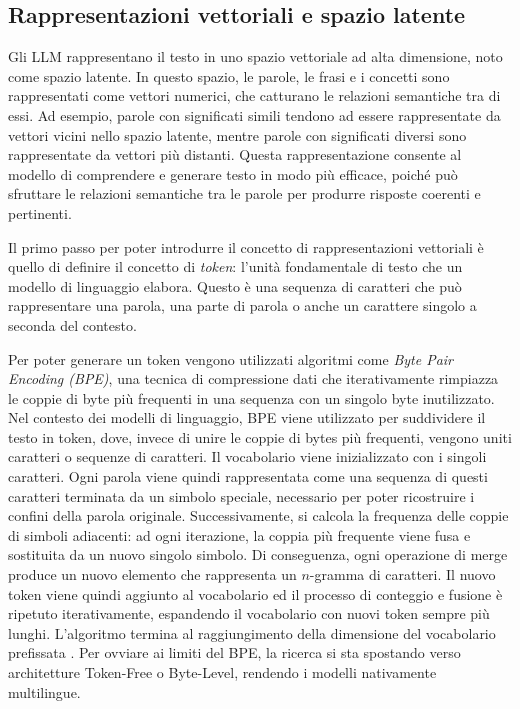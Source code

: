 \subsection{Rappresentazioni vettoriali e spazio latente}
Gli LLM rappresentano il testo in uno spazio vettoriale ad alta dimensione, noto come spazio latente. In questo spazio, le parole, le frasi e i concetti sono rappresentati come vettori numerici, che catturano le relazioni semantiche tra di essi. Ad esempio, parole con significati simili tendono ad essere rappresentate da vettori vicini nello spazio latente, mentre parole con significati diversi sono rappresentate da vettori più distanti. Questa rappresentazione consente al modello di comprendere e generare testo in modo più efficace, poiché può sfruttare le relazioni semantiche tra le parole per produrre risposte coerenti e pertinenti.

Il primo passo per poter introdurre il concetto di rappresentazioni vettoriali è quello di definire il concetto di \textit{token}: l'unità fondamentale di testo che un modello di linguaggio elabora.
Questo è una sequenza di caratteri che può rappresentare una parola, una parte di parola o anche un carattere singolo a seconda del contesto.

Per poter generare un token vengono utilizzati algoritmi come \textit{Byte Pair Encoding (BPE)}, una tecnica di compressione dati che iterativamente rimpiazza le coppie di byte più frequenti in una sequenza con un singolo byte inutilizzato. Nel contesto dei modelli di linguaggio, BPE viene utilizzato per suddividere il testo in token, dove, invece di unire le coppie di bytes più frequenti, vengono uniti caratteri o sequenze di caratteri.
Il vocabolario viene inizializzato con i singoli caratteri. Ogni parola viene quindi rappresentata come una sequenza di questi caratteri terminata da un simbolo speciale, necessario per poter ricostruire i confini della parola originale. Successivamente, si calcola la frequenza delle coppie di simboli adiacenti: ad ogni iterazione, la coppia più frequente viene fusa e sostituita da un nuovo singolo simbolo. Di conseguenza, ogni operazione di merge produce un nuovo elemento che rappresenta un $n$-gramma di caratteri.
Il nuovo token viene quindi aggiunto al vocabolario ed il processo di conteggio e fusione è ripetuto iterativamente, espandendo il vocabolario con nuovi token sempre più lunghi.
L'algoritmo termina al raggiungimento della dimensione del vocabolario prefissata \cite{sennrich2016neuralmachinetranslationrare}.
Per ovviare ai limiti del BPE, la ricerca si sta spostando verso architetture Token-Free o Byte-Level, rendendo i modelli nativamente multilingue.

